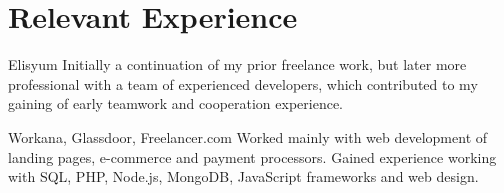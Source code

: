 \section{Relevant Experience}

\begin{experience}{Elisyum}{
}
Initially a continuation of my prior freelance work, but later more professional with a team of experienced developers, which contributed to my gaining of early teamwork and cooperation experience.

\end{experience}
\begin{experience}[last]{Workana, Glassdoor, Freelancer.com}{
}
Worked mainly with web development of landing pages, e-commerce and payment processors. Gained experience working with SQL, PHP, Node.js, MongoDB, JavaScript frameworks
 and web design.

\end{experience}
